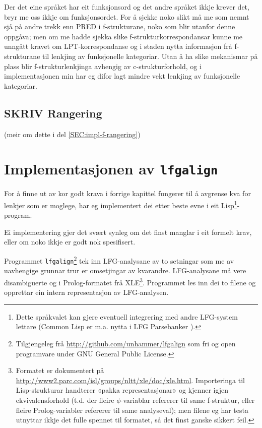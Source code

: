 \documentclass[11pt,a4paper,oneside,draft]{book}
\begin{document}
Der det eine språket har eit funksjonsord og det andre språket ikkje
krever det, bryr me oss ikkje om funksjonsordet. For å sjekke noko
slikt må me som nemnt sjå på andre trekk enn PRED i f-strukturane,
noko som blir utanfor denne oppgåva; men om me hadde sjekka slike
f-strukturkorrespondansar kunne me unngått kravet om
LPT-korrespondanse og i staden nytta informasjon frå f-strukturane til
lenkjing av funksjonelle kategoriar. Utan å ha slike mekanismar på
plass blir f-strukturlenkjinga avhengig av c-strukturforhold, og i
implementasjonen min har eg difor lagt mindre vekt lenkjing av
funksjonelle kategoriar.

\section{\textbf{SKRIV} Rangering}
\label{sec-3.8}

   \label{SEC:rangering}
(meir om dette i del \ref{SEC:impl-f-rangering})

\chapter{Implementasjonen av \texttt{lfgalign}}
\label{sec-4}

\label{SEC:implementasjon}

For å finne ut av kor godt krava i forrige kapittel fungerer til å
avgrense kva for lenkjer som er moglege, har eg implementert dei etter
beste evne i eit Lisp\footnote{Dette språkvalet kan gjere eventuell integrering med andre
        LFG-system lettare (Common Lisp er m.a. nytta i LFG
        Parsebanker \citep{rosen2009lpt}). }-program.

 Ei implementering gjer det svært synleg om det finst
manglar i eit formelt krav, eller om noko ikkje er godt nok
spesifisert.

Programmet \texttt{lfgalign}\footnote{Tilgjengeleg frå \href{http://github.com/unhammer/lfgalign}{http://github.com/unhammer/lfgalign} som fri og
       open programvare under GNU General Public License. } tek inn LFG-analysane av to
setningar som me av uavhengige grunnar trur er omsetjingar av
kvarandre. LFG-analysane må vere disambiguerte og i Prolog-formatet
frå XLE\footnote{Formatet er dokumentert på
       \href{http://www2.parc.com/isl/groups/nltt/xle/doc/xle.html}{http://www2.parc.com/isl/groups/nltt/xle/doc/xle.html}. Importeringa
       til Lisp-strukturar handterer «pakka representasjonar» og
       kjenner igjen ekvivalensforhold (t.d. der fleire
       $\phi$-variablar refererer til same f-struktur, eller fleire
       Prolog-variabler refererer til same analyseval); men filene eg
       har testa utnyttar ikkje det fulle spennet til formatet, så det
       finst ganske sikkert feil. }. Programmet les inn dei to filene og opprettar ein
intern representasjon av LFG-analysen.  
\end{document}
